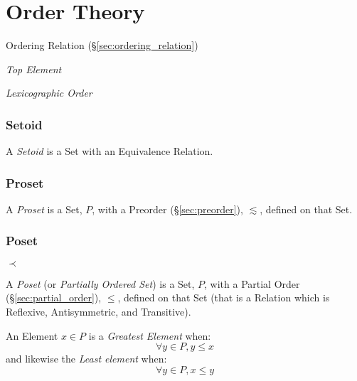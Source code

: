 \part{Order Theory}\label{sec:order_theory}

Ordering Relation (\S\ref{sec:ordering_relation})

\emph{Top Element}

\emph{Lexicographic Order}



\section{Setoid}\label{sec:setoid}

A \emph{Setoid} is a Set with an Equivalence Relation.



\section{Proset}\label{sec:proset}

A \emph{Proset} is a Set, $P$, with a Preorder
(\S\ref{sec:preorder}), $\lesssim$, defined on that Set.



\section{Poset}\label{sec:poset}

$\prec$

A \emph{Poset} (or \emph{Partially Ordered Set}) is a Set, $P$, with a
Partial Order (\S\ref{sec:partial_order}), $\leq$, defined on that
Set (that is a Relation which is Reflexive, Antisymmetric, and
Transitive).

An Element $x \in P$ is a \emph{Greatest Element} when:
\[
  \forall y \in P, y \leq x
\]
and likewise the \emph{Least element} when:
\[
  \forall y \in P, x \leq y
\]

